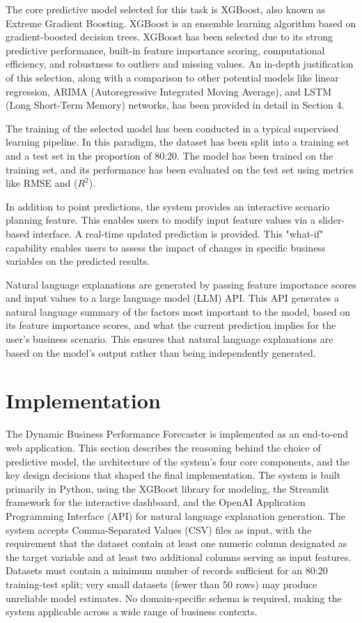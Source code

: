 \documentclass[12pt]{article}
\begin{document}
The core predictive model selected for this task is XGBoost, also known as Extreme Gradient Boosting. XGBoost is an ensemble learning algorithm based on gradient-boosted decision trees. XGBoost has been selected due to its strong predictive performance, built-in feature importance scoring, computational efficiency, and robustness to outliers and missing values. An in-depth justification of this selection, along with a comparison to other potential models like linear regression, ARIMA (Autoregressive Integrated Moving Average), and LSTM (Long Short-Term Memory) networks, has been provided in detail in Section 4.

The training of the selected model has been conducted in a typical supervised learning pipeline. In this paradigm, the dataset has been split into a training set and a test set in the proportion of 80:20. The model has been trained on the training set, and its performance has been evaluated on the test set using metrics like RMSE and ($R^2$).


In addition to point predictions, the system provides an interactive scenario planning feature. This enables users to modify input feature values via a slider-based interface. A real-time updated prediction is provided. This "what-if" capability enables users to assess the impact of changes in specific business variables on the predicted results. 

Natural language explanations are generated by passing feature importance scores and input values to a large language model (LLM) API. This API generates a natural language summary of the factors most important to the model, based on its feature importance scores, and what the current prediction implies for the user’s business scenario. This ensures that natural language explanations are based on the model’s output rather than being independently generated.

\section{Implementation}
The Dynamic Business Performance Forecaster is implemented as an end-to-end
web application. This section describes the reasoning behind the choice of predictive model,
the architecture of the system's four core components, and the key design decisions that
shaped the final implementation. The system is built primarily in Python, using the
XGBoost library for modeling, the Streamlit framework for the interactive dashboard, and
the OpenAI Application Programming Interface (API) for natural language explanation
generation. The system accepts Comma-Separated Values (CSV) files as input, with the
requirement that the dataset contain at least one numeric column designated as the target
variable and at least two additional columns serving as input features. Datasets must
contain a minimum number of records sufficient for an 80:20 training-test split; very small
datasets (fewer than 50 rows) may produce unreliable model estimates. No domain-specific
schema is required, making the system applicable across a wide range of business contexts.
\end{document}
